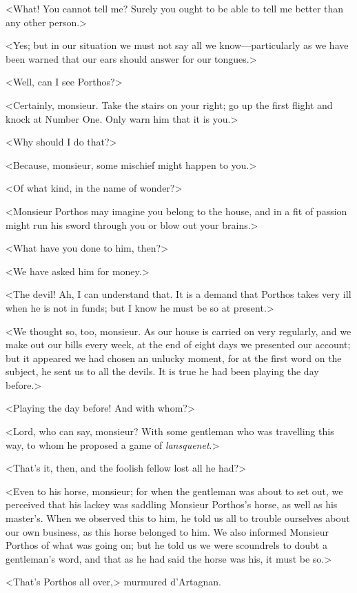 <What! You cannot tell me? Surely you ought to be able to tell me better than any other person.> 

<Yes; but in our situation we must not say all we know---particularly as we have been warned that our ears should answer for our tongues.> 

<Well, can I see Porthos?> 

<Certainly, monsieur. Take the stairs on your right; go up the first flight and knock at Number One. Only warn him that it is you.> 

<Why should I do that?> 

<Because, monsieur, some mischief might happen to you.> 

<Of what kind, in the name of wonder?> 

<Monsieur Porthos may imagine you belong to the house, and in a fit of passion might run his sword through you or blow out your brains.> 

<What have you done to him, then?> 

<We have asked him for money.> 

<The devil! Ah, I can understand that. It is a demand that Porthos takes very ill when he is not in funds; but I know he must be so at present.> 

<We thought so, too, monsieur. As our house is carried on very regularly, and we make out our bills every week, at the end of eight days we presented our account; but it appeared we had chosen an unlucky moment, for at the first word on the subject, he sent us to all the devils. It is true he had been playing the day before.> 

<Playing the day before! And with whom?> 

<Lord, who can say, monsieur? With some gentleman who was travelling this way, to whom he proposed a game of \textit{lansquenet}.> 

<That's it, then, and the foolish fellow lost all he had?> 

<Even to his horse, monsieur; for when the gentleman was about to set out, we perceived that his lackey was saddling Monsieur Porthos's horse, as well as his master's. When we observed this to him, he told us all to trouble ourselves about our own business, as this horse belonged to him. We also informed Monsieur Porthos of what was going on; but he told us we were scoundrels to doubt a gentleman's word, and that as he had said the horse was his, it must be so.> 

<That's Porthos all over,> murmured d'Artagnan. 

